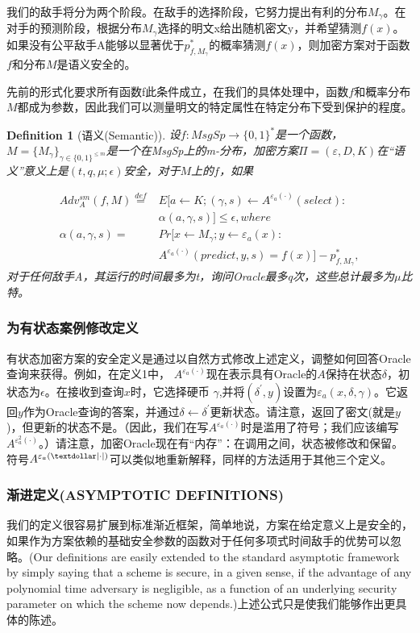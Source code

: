 \documentclass[]{article}
\newtheorem{definition}{Definition}
\begin{document}
我们的敌手将分为两个阶段。在敌手的选择阶段，它努力提出有利的分布$M_\gamma$。在对手的预测阶段，根据分布$M_\gamma$选择的明文x给出随机密文y，并希望猜测$f(x)$。如果没有公平敌手A能够以显著优于$p^*_{f,M_\gamma}$的概率猜测$f(x)$，则加密方案对于函数$f$和分布$M$是语义安全的。


先前的形式化要求所有函数f此条件成立，在我们的具体处理中，函数$f$和概率分布$M$都成为参数，因此我们可以测量明文的特定属性在特定分布下受到保护的程度。


\begin{definition}[语义(Semantic)]
	设$f: MsgSp \rightarrow \{0,1\}^*$是一个函数，$M=\{M_\gamma\}_{\gamma\in \{0,1\}^{\leq m}}$是一个在MsgSp上的m-分布，加密方案$\Pi =(\varepsilon,D,K)$在“语义”意义上是$(t,q,\mu;\epsilon)$安全，对于$M$上的$f$，如果\par
	\begin{align*}
		Adv^{sm}_A(f,M) \stackrel{def}{=} & E[a\leftarrow K;(\gamma,s)\leftarrow A^{\varepsilon_a(\cdot)}(select):\\
		 & \alpha (a,\gamma,s)]\leq \epsilon,	 where\\
		 \alpha (a,\gamma,s)=& Pr[x\leftarrow M_\gamma;y\leftarrow \varepsilon_a(x): \\
		                     & A^{\varepsilon_a(\cdot)}(predict,y,s)=f(x)]-p^*_{f,M_\gamma},
	\end{align*}
	对于任何敌手A，其运行的时间最多为t，询问Oracle最多q次，这些总计最多为$\mu$比特。		
\end{definition}

\subsubsection{为有状态案例修改定义}
有状态加密方案的安全定义是通过以自然方式修改上述定义，调整如何回答Oracle查询来获得。例如，在定义1中，
$A^{\varepsilon_a(\cdot)}$现在表示具有Oracle的$A$保持在状态$\delta$，初状态为$\epsilon$。在接收到查询$x$时，它选择硬币
$\gamma$,并将$(\delta^{'},y)$设置为$\varepsilon_a(x,\delta,\gamma)$。它返回$y$作为Oracle查询的答案，并通过$\delta \leftarrow \delta^{'}$更新状态。请注意，返回了密文(就是$y$)，但更新的状态不是。（因此，我们在写$A^{\varepsilon_a(\cdot)}$时是滥用了符号；我们应该编写$A^{\varepsilon^2_a(\cdot)}$。）请注意，加密Oracle现在有“内存”：在调用之间，状态被修改和保留。符号$A^{\varepsilon_a(\textdollar|\cdot|)}$可以类似地重新解释，同样的方法适用于其他三个定义。

\subsubsection{渐进定义(ASYMPTOTIC DEFINITIONS)}
我们的定义很容易扩展到标准渐近框架，简单地说，方案在给定意义上是安全的，如果作为方案依赖的基础安全参数的函数对于任何多项式时间敌手的优势可以忽略。(Our definitions are easily extended to the standard asymptotic framework by simply saying that a scheme is secure, in a given sense, if the advantage of any polynomial time adversary is negligible, as a function of an underlying security parameter on which the scheme now depends.)上述公式只是使我们能够作出更具体的陈述。
\end{document}
